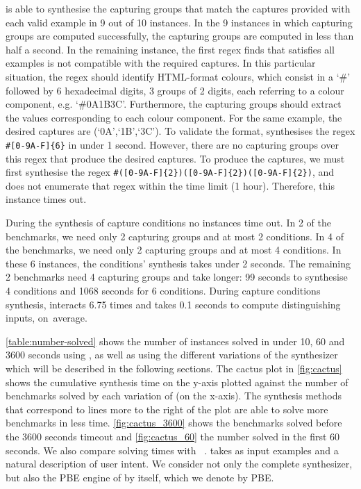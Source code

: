 \Forest is able to synthesise the capturing groups that match the captures provided with each valid example in 9 out of 10 instances. In the 9 instances in which capturing groups are computed successfully, the capturing groups are computed in less than half a second.
In the remaining instance, the first regex \Forest finds that satisfies all examples is not compatible with the required captures.
In this particular situation, the regex should identify HTML-format colours, which consist in a `\#' followed by 6 hexadecimal digits, 3 groups of 2 digits, each referring to a colour component, e.g. `\#0A1B3C'.
Furthermore, the capturing groups should extract the values corresponding to each colour component. For the same example, the desired captures are (`0A',`1B',`3C'). To validate the format, \Forest synthesises the regex \verb`#[0-9A-F]{6}` in under 1 second.
However, there are no capturing groups over this regex that produce the desired captures. To produce the captures, we must first synthesise the regex
\verb`#([0-9A-F]{2})([0-9A-F]{2})([0-9A-F]{2})`, and \Forest does not enumerate that regex within the time limit (1 hour). Therefore, this instance times out.

During the synthesis of capture conditions no instances time out. In 2 of the benchmarks, we need only 2 capturing groups and at most 2 conditions. In 4 of the benchmarks, we need only 2 capturing groups and at most 4 conditions. In these 6 instances, the conditions' synthesis takes under 2 seconds.
The remaining 2 benchmarks need 4 capturing groups and take longer: 99 seconds to synthesise 4 conditions and 1068 seconds for 6 conditions. During capture conditions synthesis, \Forest interacts 6.75 times and takes 0.1 seconds to compute distinguishing inputs, on~average.

\autoref{table:number-solved} shows the number of instances solved in under 10, 60 and 3600 seconds using \Forest{}, as well as using the different variations of the synthesizer which will be described in the following sections. The cactus plot in \autoref{fig:cactus} shows the cumulative synthesis time on the y-axis plotted against the number of benchmarks solved by each variation of \Forest{} (on the x-axis). The synthesis methods that correspond to lines more to the right of the plot are able to solve more benchmarks in less time. \autoref{fig:cactus_3600} shows the benchmarks solved before the 3600 seconds timeout and \autoref{fig:cactus_60} the number solved in the first 60 seconds.
%
We also compare solving times with \Regel~\cite{Regel20}.
\Regel takes as input examples and a natural description of user intent. We consider not only the complete \Regel synthesizer, but also the PBE engine of \Regel by itself, which we denote by \Regel PBE.

